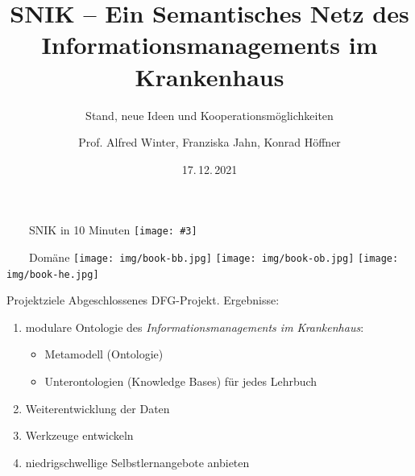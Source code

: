 \documentclass[aspectratio=1610,12pt]{beamer}
\author{Prof. Alfred Winter, Franziska Jahn, Konrad Höffner}%
\title{\Large SNIK -- Ein Semantisches Netz des Informationsmanagements im Krankenhaus}
\subtitle{Stand, neue Ideen und Kooperationsmöglichkeiten}
\date{17.\,12.\,2021}
\date{}
\newcommand{\imageslide}[4][]
{
\newgeometry{margin=0cm,top=1em}
\begin{frame}[plain]{~~~~#2}
\vspace{0.2em}
\centering\texttt{[image: \#3]}
\\#1
\note{#4}
\end{frame}
\restoregeometry
}
\begin{document}

\imageslide{SNIK in 10 Minuten}{img/snik-graph.png}{}{}

\begin{frame}[plain]{~~~~Domäne}
\centering\texttt{[image: img/book-bb.jpg]}
\centering\texttt{[image: img/book-ob.jpg]}
\centering\texttt{[image: img/book-he.jpg]}
\end{frame}
\restoregeometry

\iffalse
\begin{frame}{Projektziele}
Abgeschlossenes DFG-Projekt. Ergebnisse:
\begin{enumerate}
 \item modulare Ontologie des \textit{Informationsmanagements im Krankenhaus}: 
 \begin{itemize}
  \item Metamodell (Ontologie)
  \item Unterontologien (Knowledge Bases) für jedes Lehrbuch
 \end{itemize}
 \item Weiterentwicklung der Daten
 \item Werkzeuge entwickeln
 \item niedrigschwellige Selbstlernangebote anbieten
\end{enumerate}
\end{frame}
\end{document}
